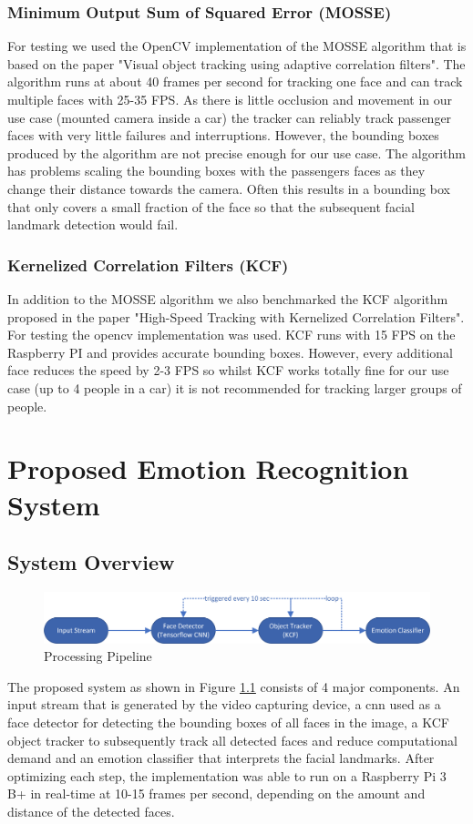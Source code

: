 \subsection{Minimum Output Sum of Squared Error (MOSSE)}
For testing we used the OpenCV implementation of the MOSSE algorithm that is based on the paper "Visual object tracking using adaptive correlation filters". \cite{Mosse} The algorithm runs at about 40 frames per second for tracking one face and can track multiple faces with 25-35 FPS. As there is little occlusion and movement in our use case (mounted camera inside a car) the tracker can reliably track passenger faces with very little failures and interruptions. However, the bounding boxes produced by the algorithm are not precise enough for our use case. The algorithm has problems scaling the bounding boxes with the passengers faces as they change their distance towards the camera. Often this results in a bounding box that only covers a small fraction of the face so that the subsequent facial landmark detection would fail.
\subsection{Kernelized Correlation Filters (KCF)}
In addition to the MOSSE algorithm we also benchmarked the KCF algorithm proposed in the paper "High-Speed Tracking with Kernelized Correlation Filters". \cite{kcf} For testing the \gls{opencv} implementation was used. KCF runs with 15 FPS on the Raspberry PI and provides accurate bounding boxes. However, every additional face reduces the speed by 2-3 FPS so whilst KCF works totally fine for our use case (up to 4 people in a car) it is not recommended for tracking larger groups of people. 
\chapter{Proposed Emotion Recognition System}
\section{System Overview}
\begin{figure}[H]
  \centering
  \includegraphics{media/diagram_emotion_detector.png}
  \caption{Processing Pipeline}
  \label{fig:systemmodel}
\end{figure}
The proposed system as shown in Figure \ref{fig:systemmodel} consists of 4 major components. An input stream that is generated by the video capturing device, a \gls{cnn} used as a face detector for detecting the bounding boxes of all faces in the image, a KCF object tracker to subsequently track all detected faces and reduce computational demand and an emotion classifier that interprets the facial landmarks. After optimizing each step, the implementation was able to run on a Raspberry Pi 3 B+ in real-time at 10-15 frames per second, depending on the amount and distance of the detected faces.
